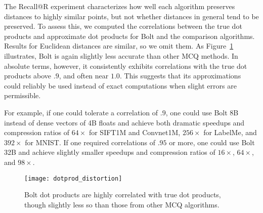 
The Recall@R experiment characterizes how well each algorithm preserves distances to highly similar points, but not whether distances in general tend to be preserved. To assess this, we computed the correlations between the true dot products and approximate dot products for Bolt and the comparison algorithms. Results for Euclidean distances are similar, so we omit them. As Figure~\ref{fig:dotprod_distortion} illustrates, Bolt is again slightly less accurate than other MCQ methods. In absolute terms, however, it consistently exhibits correlations with the true dot products above $.9$, and often near $1.0$. This suggests that its approximations could reliably be used instead of exact computations when slight errors are permissible.

For example, if one could tolerate a correlation of $.9$, one could use Bolt 8B instead of dense vectors of 4B floats and achieve both dramatic speedups and compression ratios of $64\times$ for SIFT1M and Convnet1M, $256\times$ for LabelMe, and $392\times$ for MNIST. If one required correlations of $.95$ or more, one could use Bolt 32B and achieve slightly smaller speedups and compression ratios of $16\times$, $64\times$, and $98\times$.

\begin{figure}[h]
\begin{center}
\texttt{[image: dotprod\_distortion]}
\caption{Bolt dot products are highly correlated with true dot products, though slightly less so than those from other MCQ algorithms.}
\label{fig:dotprod_distortion}
\end{center}
\end{figure}


